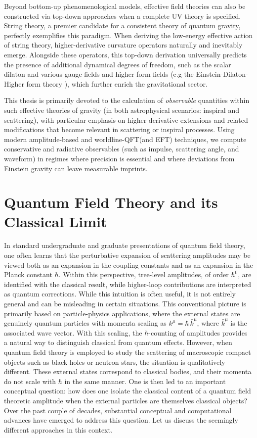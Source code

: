 Beyond bottom-up phenomenological models, effective field theories can also be constructed via top-down approaches when a complete UV theory is specified. String theory, a premier candidate for a consistent theory of quantum gravity, perfectly exemplifies this paradigm. When deriving the low-energy effective action of string theory, higher-derivative curvature operators naturally and inevitably emerge. Alongside these operators, this top-down derivation universally predicts the presence of additional dynamical degrees of freedom, such as the scalar dilaton and various gauge fields and higher form fields (e.g the Einstein-Dilaton-Higher form theory \cite{Hassan:1991mq}), which further enrich the gravitational sector.
\par
This thesis is primarily devoted to the calculation of \emph{observable} quantities within such effective theories of gravity (in both astrophysical scenarios: inspiral and scattering), with particular emphasis on higher-derivative extensions and related modifications that become relevant in scattering or inspiral processes. Using modern amplitude-based and worldline-QFT(and EFT) techniques, we compute conservative and radiative observables (such as impulse, scattering angle, and waveform) in regimes where precision is essential and where deviations from Einstein gravity can leave measurable imprints.

\section{Quantum Field Theory and its Classical Limit}
In standard undergraduate and graduate presentations of quantum field theory, one often learns that the perturbative expansion of scattering amplitudes may be viewed both as an expansion in the coupling constants and as an expansion in the Planck constant $\hbar$. Within this perspective, tree-level amplitudes, of order $\hbar^{0}$, are identified with the classical result, while higher-loop contributions are interpreted as quantum corrections. While this intuition is often useful, it is not entirely general and can be misleading in certain situations.
This conventional picture is primarily based on particle-physics applications, where the external states are genuinely quantum particles with momenta scaling as
\(k^\mu=\hbar\,\bar{k}^\mu\),
where $\bar{k}^\mu$ is the associated wave vector. With this scaling, the $\hbar$-counting of amplitudes provides a natural way to distinguish classical from quantum effects. However, when quantum field theory is employed to study the scattering of macroscopic compact objects such as black holes or neutron stars, the situation is qualitatively different. These external states correspond to classical bodies, and their momenta do not scale with $\hbar$ in the same manner. One is then led to an important conceptual question: how does one isolate the classical content of a quantum field theoretic amplitude when the external particles are themselves classical objects? Over the past couple of decades, substantial conceptual and computational advances have emerged to address this question. Let us discuss the seemingly different approaches in this context.

